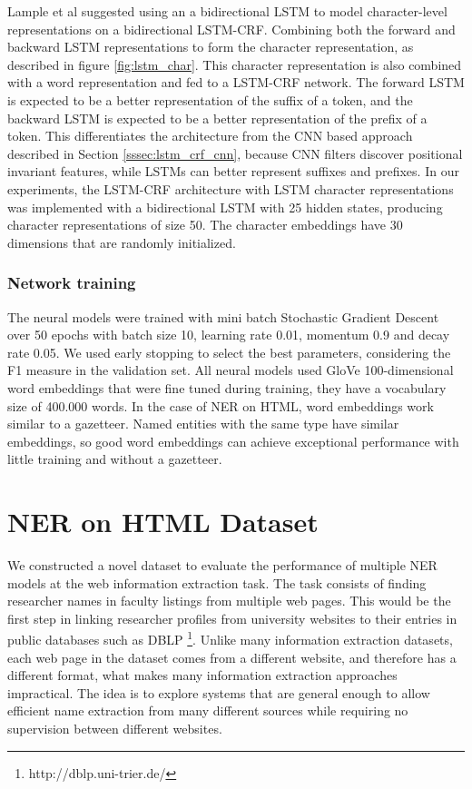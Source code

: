 \documentclass[sigconf]{acmart}
\begin{document}
Lample et al \cite{Lample2016} suggested using an a bidirectional LSTM to model character-level 
representations on a bidirectional LSTM-CRF. Combining both the forward and backward 
LSTM representations to form the character representation, as described in figure \ref{fig:lstm_char}. 
This character representation is also combined with a word representation and fed to a LSTM-CRF network. 
The forward LSTM is expected to be a better
representation of the suffix of a token, and the backward LSTM is expected to be a
better representation of the prefix of a token. This differentiates the architecture
from the CNN based approach described in Section \ref{sssec:lstm_crf_cnn}, because CNN filters 
discover positional invariant features, while LSTMs can better represent suffixes and prefixes. In our experiments, 
the LSTM-CRF architecture with LSTM character representations was implemented with a bidirectional LSTM
with 25 hidden states, producing character representations of size 50. The character embeddings
have 30 dimensions that are randomly initialized.

\subsubsection{Network training}

The neural models were trained with mini batch Stochastic Gradient Descent over 50 epochs with batch size 10,
learning rate 0.01, momentum 0.9 and decay rate 0.05. We used early stopping \cite{Caruana2000} to select the best 
parameters, considering the F1 measure in the validation set. All neural models used 
GloVe 100-dimensional word embeddings \cite{Pennington2014} that were fine tuned during training,
they have a vocabulary size of 400.000 words.
In the case of NER on HTML, word embeddings work similar to a gazetteer. Named entities 
with the same type have similar embeddings, so good word embeddings can achieve exceptional 
performance with little training and without a gazetteer. 

\section{NER on HTML Dataset}
\label{sec:ner_dataset}

We constructed a novel dataset to evaluate the performance of multiple NER models
at the web information extraction task. The task consists of finding researcher
names in faculty listings from multiple web pages. This would be the 
first step in linking researcher profiles from university websites to their entries
in public databases such as DBLP \footnote{http://dblp.uni-trier.de/}. Unlike many
information extraction datasets, each web page in the dataset comes from a different 
website, and therefore has a different format, what makes many information
extraction approaches impractical. The idea is to explore systems that are general 
enough to allow efficient name extraction from many different sources while requiring
no supervision between different websites. 
\end{document}
